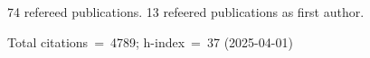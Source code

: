 74 refereed publications. 13 refeered publications as first author.

Total citations~=~4789; h-index~=~37 (2025-04-01)